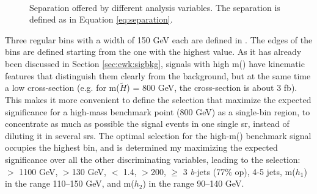 \begin{figure}[htpb]
\begin{center}
\\
\caption{Separation offered by different analysis variables. The separation is defined as in Equation \ref{eq:separation}.}
\label{fig:ewk:separation}
\end{center}
\end{figure}

Three regular bins with a width of 150 GeV each are defined in \meffb. 
The edges of the bins are defined starting from the one with the highest value. 
As it has already been discussed in Section \ref{sec:ewk:sigbkg},
signals with high m(\hino) have kinematic features that distinguish them clearly from the background, 
but at the same time a low cross-section (e.g. for m($\tilde{H}$) = 800 GeV, the cross-section is about 3 fb). 
This makes it more convenient to define the selection that maximize the expected significance for a high-mass benchmark point (800 GeV) 
as a single-bin region, to concentrate as much as possible the signal events in one single \gls{sr}, 
instead of diluting it in several \glspl{sr}. %
The optimal selection for the high-m(\hino) benchmark signal occupies the highest \meffb bin,
and is determined my maximizing the expected significance over all the other discriminating variables,
leading to the selection:
\meffb $>$ 1100 GeV, \mtb$>$130 GeV, \dRmax $<$ 1.4, \met $>$200, $\geq$ 3 \textit{b}-jets (77\% \gls{op}), 
4-5 jets, m($h_1$) in the range 110--150 GeV, and m($h_2$) in the range 90--140 GeV.


